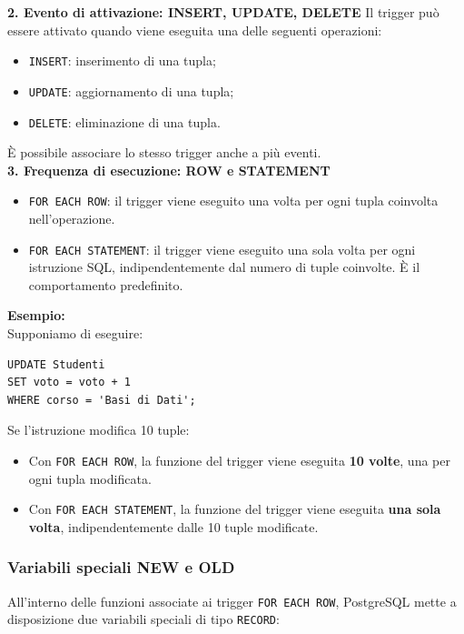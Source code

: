 \noindent
\textbf{2. Evento di attivazione: INSERT, UPDATE, DELETE}
Il trigger può essere attivato quando viene eseguita
una delle seguenti operazioni:
\begin{itemize}
    \item \texttt{INSERT}: inserimento di una tupla;
    \item \texttt{UPDATE}: aggiornamento di una tupla;
    \item \texttt{DELETE}: eliminazione di una tupla.
\end{itemize}
\noindent
È possibile associare lo stesso trigger
anche a più eventi.\medskip\\
\textbf{3. Frequenza di esecuzione: ROW e STATEMENT}

\begin{itemize}
    \item \texttt{FOR EACH ROW}: il trigger viene eseguito
    una volta per ogni tupla coinvolta nell'operazione.

    \item \texttt{FOR EACH STATEMENT}: il trigger viene
    eseguito una sola volta per ogni istruzione SQL,
    indipendentemente dal numero di tuple coinvolte.
    È il comportamento predefinito.
\end{itemize}
\noindent
\textbf{Esempio:}\\
Supponiamo di eseguire:

\begin{verbatim}
UPDATE Studenti
SET voto = voto + 1
WHERE corso = 'Basi di Dati';
\end{verbatim}
Se l'istruzione modifica 10 tuple:
\begin{itemize}
    \item Con \texttt{FOR EACH ROW}, la funzione
    del trigger viene eseguita \textbf{10 volte},
    una per ogni tupla modificata.

    \item Con \texttt{FOR EACH STATEMENT}, la funzione
    del trigger viene eseguita \textbf{una sola volta},
    indipendentemente dalle 10 tuple modificate.
\end{itemize}

\subsubsection{Variabili speciali NEW e OLD}

All'interno delle funzioni associate ai trigger
\texttt{FOR EACH ROW}, PostgreSQL mette a disposizione
due variabili speciali di tipo \texttt{RECORD}:

